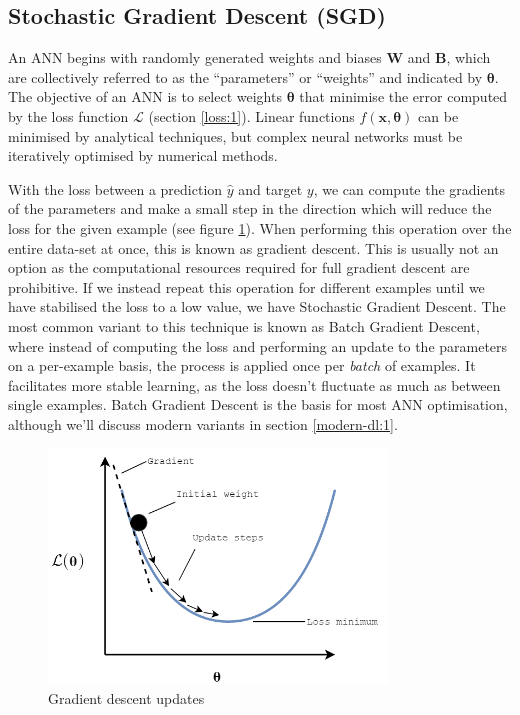 \documentclass{report}
\begin{document}
	\subsection{Stochastic Gradient Descent (SGD)} \label{sgd:1}
	An ANN begins with randomly generated weights and biases $\bm{W}$ and $\bm{B}$, which are collectively referred to as the ``parameters'' or ``weights'' and indicated by $\bm{\theta}$. The objective of an ANN is to select weights $\bm{\theta}$ that minimise the error computed by the loss function $\mathcal{L}$ (section \ref{loss:1}). Linear functions $f(\bm{x}, \bm{\theta})$ can be minimised by analytical techniques, but complex neural networks must be iteratively optimised by numerical methods. \par
	With the loss between a prediction $\hat{y}$ and target $y$, we can compute the gradients of the parameters and make a small step in the direction which will reduce the loss for the given example (see figure \ref{fig:grad-descent:1}). When performing this operation over the entire data-set at once, this is known as gradient descent. This is usually not an option as the computational resources required for full gradient descent are prohibitive. If we instead repeat this operation for different examples until we have stabilised the loss to a low value, we have Stochastic Gradient Descent. The most common variant to this technique is known as Batch Gradient Descent, where instead of computing the loss and performing an update to the parameters on a per-example basis, the process is applied once per \textit{batch} of examples. It facilitates more stable learning, as the loss doesn't fluctuate as much as between single examples. Batch Gradient Descent is the basis for most ANN optimisation, although we'll discuss modern variants in section \ref{modern-dl:1}. \par
		\begin{figure}[h]
		\centering
		\includegraphics[width=9cm]{graddescent}
		\caption{Gradient descent updates}
		\label{fig:grad-descent:1}
	\end{figure}
\end{document}
